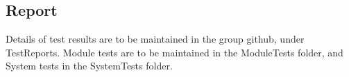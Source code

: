 \subsection{Report}
	Details of test results are to be maintained in the group github, under TestReports. Module tests are to be maintained in the ModuleTests folder, and System tests in the SystemTests folder.